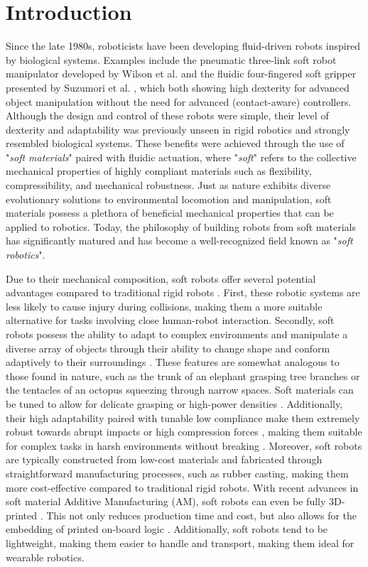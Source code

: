\section{Introduction}
\label{sec:introduction}
Since the late 1980s, roboticists have been developing fluid-driven robots inspired by biological systems. Examples include the pneumatic three-link soft robot manipulator developed by Wilson et al. \cite{Wilson1989Jun,Weisburd1988,Wilson2007} and the fluidic four-fingered soft gripper presented by Suzumori et al. \cite{Suzumori1991,Suzumori1992}, which both showing high dexterity for advanced object manipulation without the need for advanced (contact-aware) controllers. Although the design and control of these robots were simple, their level of dexterity and adaptability was previously unseen in rigid robotics and strongly resembled biological systems. These benefits were achieved through the use of "\textit{soft materials}" paired with fluidic actuation, where "\textit{soft}" refers to the collective mechanical properties of highly compliant materials such as flexibility, compressibility, and mechanical robustness. Just as nature exhibits diverse evolutionary solutions to environmental locomotion and manipulation, soft materials possess a plethora of beneficial mechanical properties that can be applied to robotics. Today, the philosophy of building robots from soft materials has significantly matured and has become a well-recognized field known as "\textit{soft robotics}".

Due to their mechanical composition, soft robots offer several potential advantages compared to traditional rigid robots \cite{Rus2015}. First, these robotic systems are less likely to cause injury during collisions, making them a more suitable alternative for tasks involving close human-robot interaction. Secondly, soft robots possess the ability to adapt to complex environments and manipulate a diverse array of objects through their ability to change shape and conform adaptively to their surroundings \cite{Hughes2016Nov,Marchese2015}. These features are somewhat analogous to those found in nature, such as the trunk of an elephant grasping tree branches or the tentacles of an octopus squeezing through narrow spaces. Soft materials can be tuned to allow for delicate grasping \cite{Sinatra2019Aug,Galloway2016} or high-power densities \cite{Li2017Dec}. Additionally, their high adaptability paired with tunable low compliance make them extremely robust towards abrupt impacts or high compression forces \cite{Bartlett2015Jul}, making them suitable for complex tasks in harsh environments without breaking \cite{Hawkes2017,Li2021Mar,Tolley2014Sep}. Moreover, soft robots are typically constructed from low-cost materials and fabricated through straightforward manufacturing processes, such as rubber casting, making them more cost-effective compared to traditional rigid robots. With recent advances in soft material Additive Manufacturing (AM), soft robots can even be fully 3D-printed \cite{Wallin2018Jun,Xavier2022Jun}. This not only reduces production time and cost, but also allows for the embedding of printed on-board logic \cite{Hubbard2021,Wehner2016}. Additionally, soft robots tend to be lightweight, making them easier to handle and transport, making them ideal for wearable robotics.

